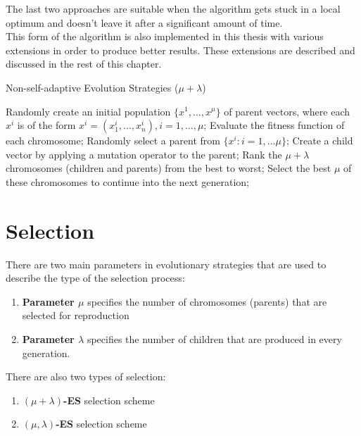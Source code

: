  The last two approaches are suitable when the algorithm gets stuck in a local optimum and doesn't leave it after a significant amount of time.\\
This form of the algorithm is also implemented in this thesis with various extensions in order to produce better results. These extensions are described and discussed in the rest of this chapter.

\begin{algorithm}[H]
\caption{Non-self-adaptive Evolution Strategies ($\mu + \lambda$)}\label{evolution-strategies}
\begin{algorithmic}[1]
    \State Randomly create an initial population $\{x^1,...,x^\mu\}$ of parent vectors, where each $x^i$ is of the form $x^i = (x_1^i,...,x_n^i), i = 1,...,\mu$;
    \State Evaluate the fitness function of each chromosome;
        \Repeat
            \State Randomly select a parent from $\{x^i : i = 1,...\mu\}$;
            \State Create a child vector by applying a mutation operator to the parent;
        \State Rank the $\mu + \lambda$ chromosomes (children and parents) from the best to worst;
        \State Select the best $\mu$ of these chromosomes to continue into the next generation;
    \EndWhile
\end{algorithmic}
\end{algorithm}

\section{Selection}
There are two main parameters in evolutionary strategies that are used to describe the type of the selection process:

 \begin{enumerate}
    \item \textbf{Parameter \boldmath$\mu$} specifies the number of chromosomes (parents) that are selected for reproduction
    \item \textbf{Parameter \boldmath$\lambda$} specifies the number of children that are produced in every generation.
 \end{enumerate}

There are also two types of selection:
\begin{center}
\begin{minipage}{.4\textwidth}
    \begin{enumerate}
        \item \boldmath$(\mu + \lambda)$\textbf{-ES} selection scheme
        \item $(\mu,\lambda)$\textbf{-ES} selection scheme
    \end{enumerate}
\end{minipage}
\end{center}

